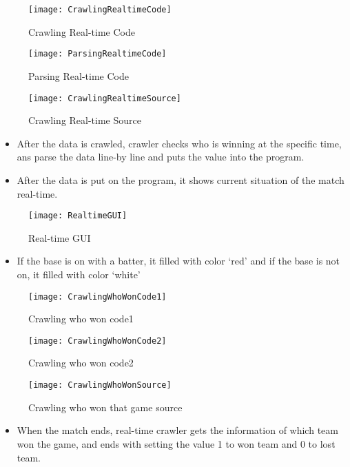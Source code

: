 \documentclass[conference,compsoc, twocolumn]{IEEEtran}
\begin{document}
\begin{figure}[H]
\centering\texttt{[image: CrawlingRealtimeCode]}
\caption{Crawling Real-time Code}
\end{figure}
\begin{figure}[H]
\centering\texttt{[image: ParsingRealtimeCode]}
\caption{Parsing Real-time Code}
\end{figure}
\begin{figure}[H]
\centering\texttt{[image: CrawlingRealtimeSource]}
\caption{Crawling Real-time Source}
\end{figure}
\begin{itemize}
\item After the data is crawled, crawler checks who is winning at the specific time, ans parse the data line-by line and puts the value into the program.
\end{itemize}
\begin{itemize}
\item After the data is put on the program, it shows current situation of the match real-time.
\end{itemize}
\begin{figure}[H]
\centering\texttt{[image: RealtimeGUI]}
\caption{Real-time GUI}
\end{figure}
\begin{itemize}
\item If the base is on with a batter, it filled with color ‘red’ and if the base is not on, it filled with color ‘white’
\end{itemize}
\begin{figure}[H]
\centering\texttt{[image: CrawlingWhoWonCode1]}
\caption{Crawling who won code1}
\end{figure}
\begin{figure}[H]
\centering\texttt{[image: CrawlingWhoWonCode2]}
\caption{Crawling who won code2}
\end{figure}
\begin{figure}[H]
\centering\texttt{[image: CrawlingWhoWonSource]}
\caption{Crawling who won that game source}
\end{figure}
\begin{itemize}
\item When the match ends, real-time crawler gets the information of which team won the game, and ends with setting the value 1 to won team and 0 to lost team.
\end{itemize}
\end{document}
